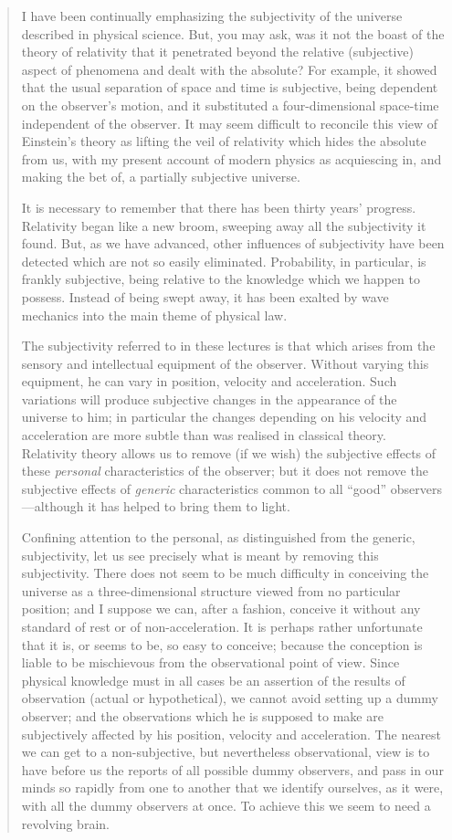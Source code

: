 \begin{quote}
    I have been continually emphasizing the subjectivity of the universe described in physical science.  But, you may ask, was it not the boast of the theory of relativity that it penetrated beyond the relative (subjective) aspect of phenomena and dealt with the absolute?  For example, it showed that the usual separation of space and time is subjective, being dependent on the observer's motion, and it substituted a four-dimensional space-time independent of the observer.  It may seem difficult to reconcile this view of Einstein's theory as lifting the veil of relativity which hides the absolute from us, with my present account of modern physics as acquiescing in, and making the bet of, a partially subjective universe.

    It is necessary to remember that there has been thirty years' progress.  Relativity began like a new broom, sweeping away all the subjectivity it found.  But, as we have advanced, other influences of subjectivity have been detected which are not so easily eliminated.  Probability, in particular, is frankly subjective, being relative to the knowledge which we happen to possess.  Instead of being swept away, it has been exalted by wave mechanics into the main theme of physical law.

    The subjectivity referred to in these lectures is that which arises from the sensory and intellectual equipment of the observer.  Without varying this equipment, he can vary in position, velocity and acceleration.  Such variations will produce subjective changes in the appearance of the universe to him; in particular the changes depending on his velocity and acceleration are more subtle than was realised in classical theory.  Relativity theory allows us to remove (if we wish) the subjective effects of these \emph{personal} characteristics of the observer; but it does not remove the subjective effects of \emph{generic} characteristics common to all ``good'' observers---although it has helped to bring them to light.

    Confining attention to the personal, as distinguished from the generic, subjectivity, let us see precisely what is meant by removing this subjectivity.  There does not seem to be much difficulty in conceiving the universe as a three-dimensional structure viewed from no particular position; and I suppose we can, after a fashion, conceive it without any standard of rest or of non-acceleration.  It is perhaps rather unfortunate that it is, or seems to be, so easy to conceive; because the conception is liable to be mischievous from the observational point of view.  Since physical knowledge must in all cases be an assertion of the results of observation (actual or hypothetical), we cannot avoid setting up a dummy observer; and the observations which he is supposed to make are subjectively affected by his position, velocity and acceleration.  The nearest we can get to a non-subjective, but nevertheless observational, view is to have before us the reports of all possible dummy observers, and pass in our minds so rapidly from one to another that we identify ourselves, as it were, with all the dummy observers at once.  To achieve this we seem to need a revolving brain.  


\end{quote}
